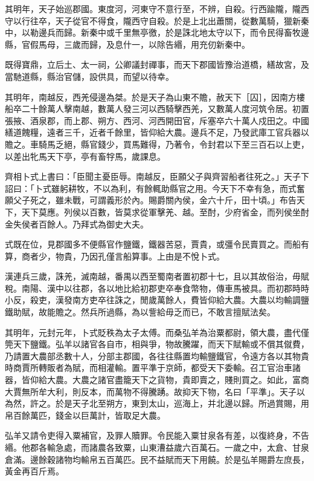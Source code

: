 \begin{pinyinscope}
其明年，天子始巡郡國。東度河，河東守不意行至，不辨，自殺。行西踰隴，隴西守以行往卒，天子從官不得食，隴西守自殺。於是上北出蕭關，從數萬騎，獵新秦中，以勒邊兵而歸。新秦中或千里無亭徼，於是誅北地太守以下，而令民得畜牧邊縣，官假馬母，三歲而歸，及息什一，以除告緡，用充仞新秦中。

既得寶鼎，立后土、太一祠，公卿議封禪事，而天下郡國皆豫治道橋，繕故宮，及當馳道縣，縣治官儲，設供具，而望以待幸。

其明年，南越反，西羌侵邊為桀。於是天子為山東不贍，赦天下［囚］，因南方樓船卒二十餘萬人擊南越，數萬人發三河以西騎擊西羌，又數萬人度河筑令居。初置張掖、酒泉郡，而上郡、朔方、西河、河西開田官，斥塞卒六十萬人戍田之。中國繕道餽糧，遠者三千，近者千餘里，皆仰給大農。邊兵不足，乃發武庫工官兵器以贍之。車騎馬乏絕，縣官錢少，買馬難得，乃著令，令封君以下至三百石以上吏，以差出牝馬天下亭，亭有畜牸馬，歲課息。

齊相卜式上書曰：「臣聞主憂臣辱。南越反，臣願父子與齊習船者往死之。」天子下詔曰：「卜式雖躬耕牧，不以為利，有餘輒助縣官之用。今天下不幸有急，而式奮願父子死之，雖未戰，可謂義形於內。賜爵關內侯，金六十斤，田十頃。」布告天下，天下莫應。列侯以百數，皆莫求從軍擊羌、越。至酎，少府省金，而列侯坐酎金失侯者百餘人。乃拜式為御史大夫。

式既在位，見郡國多不便縣官作鹽鐵，鐵器苦惡，賈貴，或彊令民賣買之。而船有算，商者少，物貴，乃因孔僅言船算事。上由是不悅卜式。

漢連兵三歲，誅羌，滅南越，番禺以西至蜀南者置初郡十七，且以其故俗治，毋賦稅。南陽、漢中以往郡，各以地比給初郡吏卒奉食幣物，傳車馬被具。而初郡時時小反，殺吏，漢發南方吏卒往誅之，閒歲萬餘人，費皆仰給大農。大農以均輸調鹽鐵助賦，故能贍之。然兵所過縣，為以訾給毋乏而已，不敢言擅賦法矣。

其明年，元封元年，卜式貶秩為太子太傅。而桑弘羊為治粟都尉，領大農，盡代僅筦天下鹽鐵。弘羊以諸官各自市，相與爭，物故騰躍，而天下賦輸或不償其僦費，乃請置大農部丞數十人，分部主郡國，各往往縣置均輸鹽鐵官，令遠方各以其物貴時商賈所轉販者為賦，而相灌輸。置平準于京師，都受天下委輸。召工官治車諸器，皆仰給大農。大農之諸官盡籠天下之貨物，貴即賣之，賤則買之。如此，富商大賈無所牟大利，則反本，而萬物不得騰踴。故抑天下物，名曰「平準」。天子以為然，許之。於是天子北至朔方，東到太山，巡海上，并北邊以歸。所過賞賜，用帛百餘萬匹，錢金以巨萬計，皆取足大農。

弘羊又請令吏得入粟補官，及罪人贖罪。令民能入粟甘泉各有差，以復終身，不告緡。他郡各輸急處，而諸農各致粟，山東漕益歲六百萬石。一歲之中，太倉、甘泉倉滿。邊餘穀諸物均輸帛五百萬匹。民不益賦而天下用饒。於是弘羊賜爵左庶長，黃金再百斤焉。


\end{pinyinscope}
